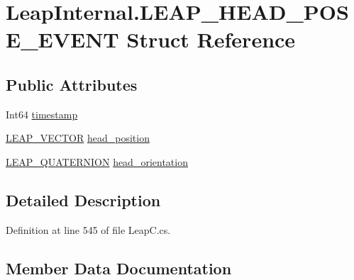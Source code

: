 \hypertarget{struct_leap_internal_1_1_l_e_a_p___h_e_a_d___p_o_s_e___e_v_e_n_t}{}\section{Leap\+Internal.\+L\+E\+A\+P\+\_\+\+H\+E\+A\+D\+\_\+\+P\+O\+S\+E\+\_\+\+E\+V\+E\+NT Struct Reference}
\label{struct_leap_internal_1_1_l_e_a_p___h_e_a_d___p_o_s_e___e_v_e_n_t}
\subsection*{Public Attributes}
\begin{DoxyCompactItemize}
\item 
Int64 \mbox{\hyperlink{struct_leap_internal_1_1_l_e_a_p___h_e_a_d___p_o_s_e___e_v_e_n_t_a264e542aa1ff04b5c76cffcad9adc8d2}{timestamp}}
\item 
\mbox{\hyperlink{struct_leap_internal_1_1_l_e_a_p___v_e_c_t_o_r}{L\+E\+A\+P\+\_\+\+V\+E\+C\+T\+OR}} \mbox{\hyperlink{struct_leap_internal_1_1_l_e_a_p___h_e_a_d___p_o_s_e___e_v_e_n_t_a5390f8a74376462a0299ac6e61da7ed5}{head\+\_\+position}}
\item 
\mbox{\hyperlink{struct_leap_internal_1_1_l_e_a_p___q_u_a_t_e_r_n_i_o_n}{L\+E\+A\+P\+\_\+\+Q\+U\+A\+T\+E\+R\+N\+I\+ON}} \mbox{\hyperlink{struct_leap_internal_1_1_l_e_a_p___h_e_a_d___p_o_s_e___e_v_e_n_t_a3bdb62b598ae65fb99748821c5e90177}{head\+\_\+orientation}}
\end{DoxyCompactItemize}


\subsection{Detailed Description}


Definition at line 545 of file Leap\+C.\+cs.



\subsection{Member Data Documentation}
\mbox{\label{struct_leap_internal_1_1_l_e_a_p___h_e_a_d___p_o_s_e___e_v_e_n_t_a3bdb62b598ae65fb99748821c5e90177}} 

